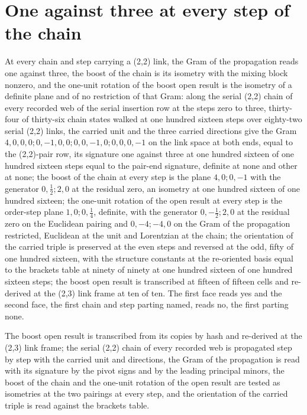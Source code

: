 \section{One against three at every step of the chain}\label{mod:III-3-D543402-emis-t1}
\begin{chtheorem}\label{box:III-3-D543402-emis-t1:1}
At every chain and step carrying a (2,2) link, the Gram of the propagation reads one against three, the boost of the chain is its isometry with the mixing block nonzero, and the one-unit rotation of the boost open result is the isometry of a definite plane and of no restriction of that Gram: along the serial (2,2) chain of every recorded web of the serial insertion row at the steps zero to three, thirty-four of thirty-six chain states walked at one hundred sixteen steps over eighty-two serial (2,2) links, the carried unit and the three carried directions give the Gram $4,0,0,0;0,-1,0,0;0,0,-1,0;0,0,0,-1$ on the link space at both ends, equal to the (2,2)-pair row, its signature one against three at one hundred sixteen of one hundred sixteen steps equal to the pair-end signature, definite at none and other at none; the boost of the chain at every step is the plane $4,0;0,-1$ with the generator $0,\tfrac{1}{2};2,0$ at the residual zero, an isometry at one hundred sixteen of one hundred sixteen; the one-unit rotation of the open result at every step is the order-step plane $1,0;0,\tfrac{1}{4}$, definite, with the generator $0,-\tfrac{1}{2};2,0$ at the residual zero on the Euclidean pairing and $0,-4;-4,0$ on the Gram of the propagation restricted, Euclidean at the unit and Lorentzian at the chain; the orientation of the carried triple is preserved at the even steps and reversed at the odd, fifty of one hundred sixteen, with the structure constants at the re-oriented basis equal to the brackets table at ninety of ninety at one hundred sixteen of one hundred sixteen steps; the boost open result is transcribed at fifteen of fifteen cells and re-derived at the (2,3) link frame at ten of ten. The first face reads yes and the second face, the first chain and step parting named, reads no, the first parting none.
\end{chtheorem}
The boost open result is transcribed from its copies by hash and re-derived at the (2,3) link frame; the serial (2,2) chain of every recorded web is propagated step by step with the carried unit and directions, the Gram of the propagation is read with its signature by the pivot signs and by the leading principal minors, the boost of the chain and the one-unit rotation of the open result are tested as isometries at the two pairings at every step, and the orientation of the carried triple is read against the brackets table.
